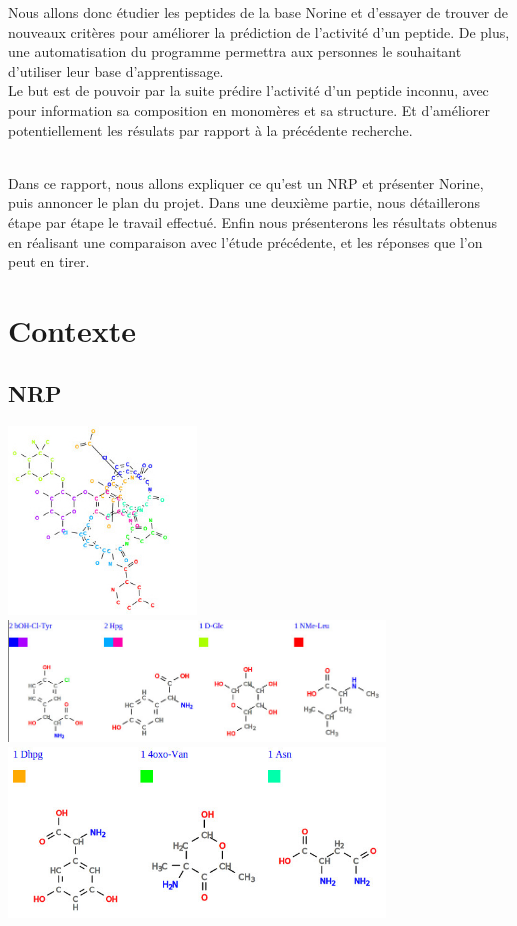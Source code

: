 \documentclass[a4paper,10pt]{report}
\begin{document}
      Nous allons donc étudier les peptides de la base Norine et d'essayer de trouver de nouveaux critères pour améliorer la prédiction de l'activité d'un peptide. De plus, une automatisation du programme permettra aux personnes le souhaitant d'utiliser leur base d'apprentissage.
      ~~\\Le but est de pouvoir par la suite prédire l'activité d'un peptide inconnu, avec pour information sa composition en monomères et sa structure. Et d'améliorer potentiellement les résulats par rapport à la précédente recherche.
     
     
      ~~\\Dans ce rapport, nous allons expliquer ce qu'est un NRP et présenter Norine, puis annoncer le plan du projet. Dans une deuxième partie, nous détaillerons étape par étape le travail effectué. Enfin nous présenterons les résultats obtenus en réalisant une comparaison avec l'étude précédente, et les réponses que l'on peut en tirer.
     
      \newpage


  \chapter{Contexte}

    
    \section{NRP}
    

     
      \begin{minipage}[c]{\textwidth}
	\centering
	  \includegraphics[width=5cm]{image/v.jpeg}
	  \includegraphics[width=10cm]{image/mono1.jpeg}
	  \includegraphics[width=10cm]{image/mono2.jpeg}
	  \label{image1}
	\end{minipage}
	
\end{document}

